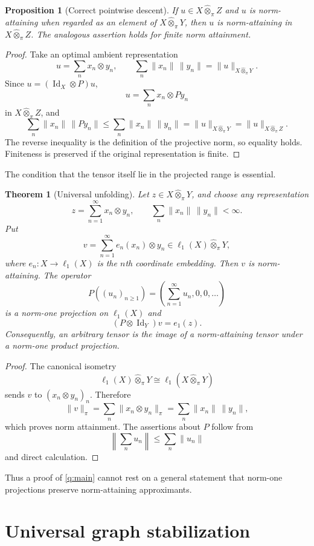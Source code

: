 \documentclass[11pt]{article}
\newtheorem{theorem}{Theorem}[section]
\newtheorem{proposition}[proposition]{Proposition}
\theoremstyle{definition}
\theoremstyle{remark}
\newcommand{\whot}{\widehat\otimes_\pi}
\newcommand{\id}{\operatorname{Id}}
\begin{document}
\begin{proposition}[Correct pointwise descent]\label{prop:pointwise}
If $u\in X\whot Z$ and $u$ is norm-attaining when regarded as an element of $X\whot Y$, then $u$ is norm-attaining in $X\whot Z$.  The analogous assertion holds for finite norm attainment.
\end{proposition}

\begin{proof}
Take an optimal ambient representation
\[
 u=\sum_nx_n\otimes y_n,
 \qquad
 \sum_n\|x_n\|\,\|y_n\|=\|u\|_{X\whot Y}.
\]
Since $u=(\id_X\otimes P)u$,
\[
 u=\sum_nx_n\otimes P y_n
\]
in $X\whot Z$, and
\[
 \sum_n\|x_n\|\,\|Py_n\|
 \leq\sum_n\|x_n\|\,\|y_n\|
 =\|u\|_{X\whot Y}
 =\|u\|_{X\whot Z}.
\]
The reverse inequality is the definition of the projective norm, so equality holds.  Finiteness is preserved if the original representation is finite.
\end{proof}

The condition that the tensor itself lie in the projected range is essential.

\begin{theorem}[Universal unfolding]\label{thm:unfolding}
Let $z\in X\whot Y$, and choose any representation
\[
 z=\sum_{n=1}^\infty x_n\otimes y_n,
 \qquad
 \sum_n\|x_n\|\,\|y_n\|<\infty.
\]
Put
\[
 v=\sum_{n=1}^\infty e_n(x_n)\otimes y_n
 \in\ell_1(X)\whot Y,
\]
where $e_n:X\to\ell_1(X)$ is the $n$th coordinate embedding.  Then $v$ is norm-attaining.  The operator
\[
 P((u_n)_{n\geq1})=
 \left(\sum_{n=1}^\infty u_n,0,0,\ldots\right)
\]
is a norm-one projection on $\ell_1(X)$ and
\[
 (P\otimes\id_Y)v=e_1(z).
\]
Consequently, an arbitrary tensor is the image of a norm-attaining tensor under a norm-one product projection.
\end{theorem}

\begin{proof}
The canonical isometry
\[
 \ell_1(X)\whot Y\cong\ell_1(X\whot Y)
\]
sends $v$ to $(x_n\otimes y_n)_n$.  Therefore
\[
 \|v\|_\pi
 =\sum_n\|x_n\otimes y_n\|_\pi
 =\sum_n\|x_n\|\,\|y_n\|,
\]
which proves norm attainment.  The assertions about $P$ follow from
\[
 \left\|\sum_nu_n\right\|\leq\sum_n\|u_n\|
\]
and direct calculation.
\end{proof}

Thus a proof of \cref{q:main} cannot rest on a general statement that norm-one projections preserve norm-attaining approximants.

\section{Universal graph stabilization}
\end{document}
